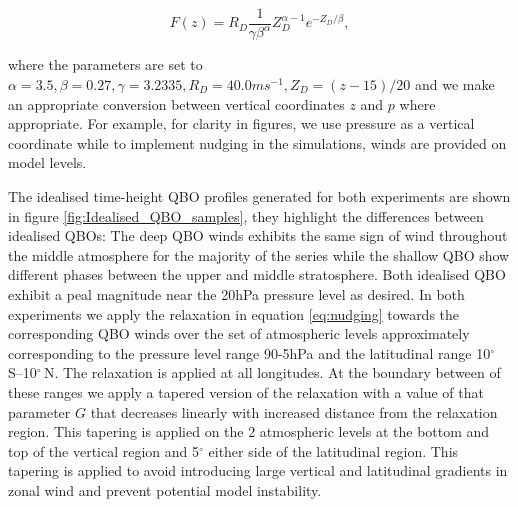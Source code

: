 \begin{equation} \label{eq:vertical_profile}
F(z) = R_D \frac{1}{\gamma \beta^\alpha}  Z_D^{\alpha-1}  e^{-Z_D/\beta},
\end{equation}

where the parameters are set to $\alpha = 3.5, \beta = 0.27, \gamma = 3.2335, R_D = 40.0 ms^{-1}, Z_{D} = (z - 15)/20$ and we make an appropriate conversion between vertical coordinates $z$ and $p$ where appropriate. For example, for clarity in figures, we use pressure as a vertical coordinate while to implement nudging in the simulations, winds are provided on model levels.

The idealised time-height QBO profiles generated for both experiments are shown in figure \ref{fig:Idealised_QBO_samples}, they highlight the differences between idealised QBOs: The deep QBO winds exhibits the same sign of wind throughout the middle atmosphere for the majority of the series while the shallow QBO show different phases between the upper and middle stratosphere. Both idealised QBO exhibit a peal magnitude near the 20hPa pressure level as desired. In both experiments we apply the relaxation in equation \ref{eq:nudging} towards the corresponding QBO winds over the set of atmospheric levels approximately corresponding to the pressure level range 90-5hPa and the latitudinal range 10$^{\circ}$\,S--10$^{\circ}$\,N. The relaxation is applied at all longitudes. At the boundary between of these ranges we apply a tapered version of the relaxation with a value of that parameter $G$ that decreases linearly with increased distance from the relaxation region. This tapering is applied on the 2 atmospheric levels at the bottom and top of the vertical region and 5$^\circ$ either side of the latitudinal region. This tapering is applied to avoid introducing large vertical and latitudinal gradients in zonal wind and prevent potential model instability. 

